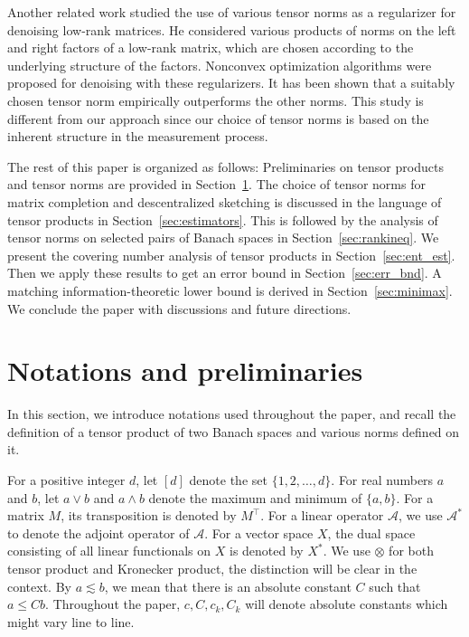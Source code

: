 \documentclass[11pt]{article}
\begin{document}
Another related work \citep{bruer2017recovering} studied the use of various tensor norms as a regularizer for denoising low-rank matrices. 
He considered various products of norms on the left and right factors of a low-rank matrix, which are chosen according to the underlying structure of the factors. 
Nonconvex optimization algorithms were proposed for denoising with these regularizers. It has been shown that a suitably chosen tensor norm empirically outperforms the other norms. 
This study is different from our approach since our choice of tensor norms is based on the inherent structure in the measurement process.

The rest of this paper is organized as follows: Preliminaries on tensor products and tensor norms are provided in Section~\ref{sec:prelim}.
The choice of tensor norms for matrix completion and descentralized sketching is discussed in the language of tensor products in Section~\ref{sec:estimators}.
This is followed by the analysis of tensor norms on selected pairs of Banach spaces in Section~\ref{sec:rankineq}. 
We present the covering number analysis of tensor products in Section~\ref{sec:ent_est}. Then we apply these results to get an error bound in Section~\ref{sec:err_bnd}. 
A matching information-theoretic lower bound is derived in Section~\ref{sec:minimax}. 
We conclude the paper with discussions and future directions. 


\section{Notations and preliminaries}
\label{sec:prelim}

In this section, we introduce notations used throughout the paper, and recall the definition of a tensor product of two Banach spaces and various norms defined on it.

For a positive integer $d$, let $[d]$ denote the set $\{1,2,\dots,d\}$. 
For real numbers $a$ and $b$, let $a \vee b$ and $a \wedge b$ denote the maximum and minimum of $\{a,b\}$. 
For a matrix $M$, its transposition is denoted by $M^\top$. 
For a linear operator $\mathcal{A}$, we use $\mathcal{A}^*$ to denote the adjoint operator of $\mathcal{A}$. 
For a vector space $X$, the dual space consisting of all linear functionals on $X$ is denoted by $X^*$.
We use $\otimes$ for both tensor product and Kronecker product, the distinction will be clear in the context. 
By $a \lesssim b$, we mean that there is an absolute constant $C$ such that $a \leq C b$. 
Throughout the paper, $c, C, c_k, C_k$ will denote absolute constants which might vary line to line. 
\end{document}
